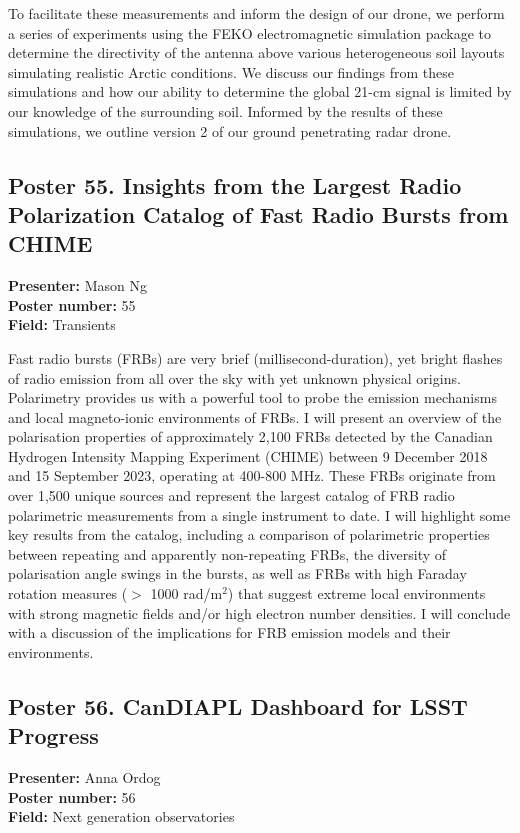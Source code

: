 To facilitate these measurements and inform the design of our drone, we perform a series of experiments using the FEKO electromagnetic simulation package to determine the directivity of the antenna above various heterogeneous soil layouts simulating realistic Arctic conditions. We discuss our findings from these simulations and how our ability to determine the global 21-cm signal is limited by our knowledge of the surrounding soil. Informed by the results of these simulations, we outline version 2 of our ground penetrating radar drone.

\hypertarget{poster-abstract-talk-235}{}\label{poster-abstract-page-talk-235}
\subsection*{Poster 55. Insights from the Largest Radio Polarization Catalog of Fast Radio Bursts from CHIME}
\textbf{Presenter:} Mason Ng\\
\textbf{Poster number:} 55\\
\textbf{Field:} Transients

Fast radio bursts (FRBs) are very brief (millisecond-duration), yet bright flashes of radio emission from all over the sky with yet unknown physical origins. Polarimetry provides us with a powerful tool to probe the emission mechanisms and local magneto-ionic environments of FRBs. I will present an overview of the polarisation properties of approximately 2,100 FRBs detected by the Canadian Hydrogen Intensity Mapping Experiment (CHIME) between 9 December 2018 and 15 September 2023, operating at 400-800 MHz. These FRBs originate from over 1,500 unique sources and represent the largest catalog of FRB radio polarimetric measurements from a single instrument to date. I will highlight some key results from the catalog, including a comparison of polarimetric properties between repeating and apparently non-repeating FRBs, the diversity of polarisation angle swings in the bursts, as well as FRBs with high Faraday rotation measures ($>$ 1000 rad/m$^2$) that suggest extreme local environments with strong magnetic fields and/or high electron number densities. I will conclude with a discussion of the implications for FRB emission models and their environments.

\hypertarget{poster-abstract-talk-266}{}\label{poster-abstract-page-talk-266}
\subsection*{Poster 56. CanDIAPL Dashboard for LSST Progress}
\textbf{Presenter:} Anna Ordog\\
\textbf{Poster number:} 56\\
\textbf{Field:} Next generation observatories

